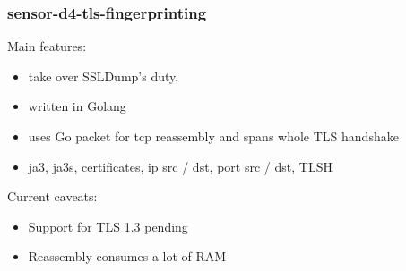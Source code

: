 \documentclass{beamer}
\begin{document}
\begin{frame}
        \frametitle{sensor-d4-tls-fingerprinting}
        Main features:
        \begin{itemize}
          \item take over SSLDump's duty,
          \item written in Golang 
          \item uses Go packet for tcp reassembly and spans whole TLS handshake
          \item ja3, ja3s, certificates, ip src / dst, port src / dst, TLSH
        \end{itemize}
        Current caveats:
        \begin{itemize}
          \item Support for TLS 1.3 pending
          \item Reassembly consumes a lot of RAM
        \end{itemize}
\end{frame}
\end{document}
